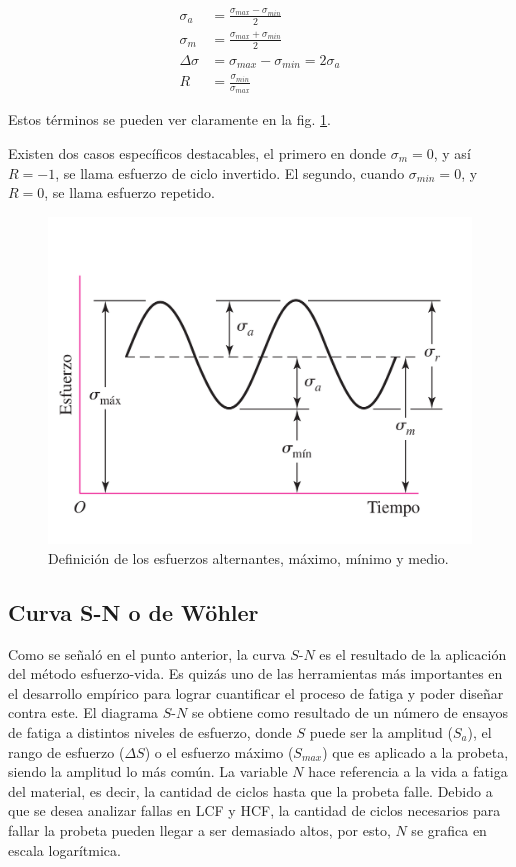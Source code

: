 \begin{align}
	\sigma_a &= \frac{\sigma_{max} - \sigma_{min}}{2} \label{eq:s_a} \\
	\sigma_m &= \frac{\sigma_{max} + \sigma_{min}}{2} \label{eq:s_m} \\
	\Delta \sigma &= \sigma_{max} - \sigma_{min} = 2\sigma_a  \label{eq:ds} \\
	R &= \frac{\sigma_{min}}{\sigma_{max}} \label{eq:r_s} 
\end{align}

Estos términos se pueden ver claramente en la fig. \ref{fig:defesf_fat}.

\newpage

Existen dos casos específicos destacables, el primero en donde $\sigma_m = 0$, y así $R=-1$, se llama esfuerzo de ciclo invertido. El segundo, cuando $\sigma_{min}=0$, y $R=0$, se llama esfuerzo repetido.

\begin{figure}[h]
\centering
\includegraphics[width=0.6\linewidth, trim={0cm 1cm 0cm 2cm},clip]{Imagenes/defesf_fat.pdf}
\caption{Definición de los esfuerzos alternantes, máximo, mínimo y medio. \cite{budynas2008shigley}}
\label{fig:defesf_fat}
\end{figure}

\subsection{Curva S-N o de Wöhler}
Como se señaló en el punto anterior, la curva $S$-$N$ es el resultado de la aplicación del método esfuerzo-vida. Es quizás uno de las herramientas más importantes en el desarrollo empírico para lograr cuantificar el proceso de fatiga y poder diseñar contra este. El diagrama $S$-$N$ se obtiene como resultado de un número de ensayos de fatiga a distintos niveles de esfuerzo, donde $S$ puede ser la amplitud ($S_a$), el rango de esfuerzo ($\Delta S$) o el esfuerzo máximo ($S_{max}$) que es aplicado a la probeta, siendo la amplitud lo más común. La variable $N$ hace referencia a la vida a fatiga del material, es decir, la cantidad de ciclos hasta que la probeta falle. Debido a que se desea analizar fallas en LCF y HCF, la cantidad de ciclos necesarios para fallar la probeta pueden llegar a ser demasiado altos, por esto, $N$ se grafica en escala logarítmica.

